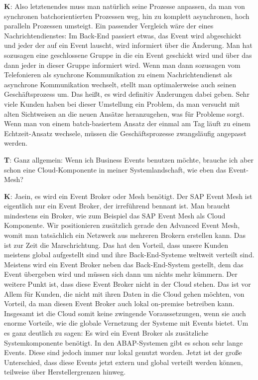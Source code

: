 \begin{list}{X:}{\setlength{\labelsep}{5mm}}
    \item[\textbf{K}:] Also letztenendes muss man natürlich seine Prozesse anpassen, da man von synchronen batchorientierten Prozessen weg, hin zu komplett asynchronen, hoch paralleln Prozessen umsteigt. Ein passender Vergleich wäre der eines Nachrichtendienstes: Im Back-End passiert etwas, das Event wird abgeschickt und jeder der auf ein Event lauscht, wird informiert über die Änderung. Man hat sozusagen eine geschlossene Gruppe in die ein Event geschickt wird und über das dann jeder in dieser Gruppe informiert wird. Wenn man dann sozusagen vom Telefonieren als synchrone Kommunikation zu einem Nachrichtendienst als asynchrone Kommunikation wechselt, stellt man optimalerweise auch seinen Geschäftsprozess um. Das hei{\ss}t, es wird definitiv Änderungen dabei geben. Sehr viele Kunden haben bei dieser Umstellung ein Problem, da man versucht mit alten Sichtweisen an die neuen Ansätze heranzugehen, was für Probleme sorgt. Wenn man von einem batch-basiertem Ansatz der einmal am Tag läuft zu einem Echtzeit-Ansatz wechsele, müssen die Geschäftsprozesse zwangsläufig angepasst werden.
    \item[\textbf{T}:] Ganz allgemein: Wenn ich Business Events benutzen möchte, brauche ich aber schon eine Cloud-Komponente in meiner Systemlandschaft, wie eben das Event-Mesh?
    \item[\textbf{K}:] Jaein, es wird ein Event Broker oder Mesh benötigt. Der SAP Event Mesh ist eigentlich nur ein Event Broker, der irreführend bennant ist. Man braucht mindestens ein Broker, wie zum Beispiel das SAP Event Mesh als Cloud Komponente. Wir positionieren zusätzlich gerade den Advanced Event Mesh, womit man tatsächlich ein Netzwerk aus mehreren Brokern erstellen kann. Das ist zur Zeit die Marschrichtung. Das hat den Vorteil, dass unsere Kunden meistens global aufgestellt sind und ihre Back-End-Systeme weltweit verteilt sind. Meistens wird ein Event Broker neben das Back-End-System gestellt, dem das Event übergeben wird und müssen sich dann um nichts mehr kümmern. Der weitere Punkt ist, dass diese Event Broker nicht in der Cloud stehen. Das ist vor Allem für Kunden, die nicht mit ihren Daten in die Cloud gehen möchten, von Vorteil, da man diesen Event Broker auch lokal on-premise betreiben kann. Insgesamt ist die Cloud somit keine zwingende Voraussetzungen, wenn sie auch enorme Vorteile, wie die globale Vernetzung der Systeme mit Events bietet. Um es ganz deutlich zu sagen: Es wird ein Event Broker als zusätzliche Systemkomponente benötigt. In den ABAP-Systemen gibt es schon sehr lange Events. Diese sind jedoch immer nur lokal genutzt worden. Jetzt ist der gro{\ss}e Unterschied, dass diese Events jetzt extern und global verteilt werden können, teilweise über Herstellergrenzen hinweg.

\end{list}
